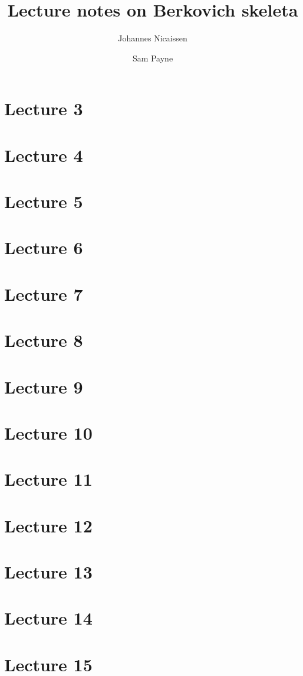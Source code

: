 \documentclass[10pt,a4paper]{article}
\title{Lecture notes on Berkovich skeleta}
\author{Johannes Nicaissen \and Sam Payne}
\numberwithin{equation}{section}
\begin{document}
\maketitle




\section{Lecture 3}
\section{Lecture 4}
\section{Lecture 5}
\section{Lecture 6}
\section{Lecture 7}
\section{Lecture 8}
\section{Lecture 9}
\section{Lecture 10}
\section{Lecture 11}
\section{Lecture 12}
\section{Lecture 13}
\section{Lecture 14}
\section{Lecture 15}
\end{document}
